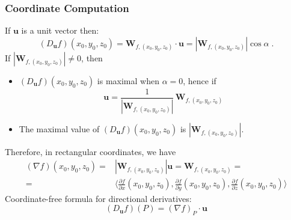 \begin{frame}
  \frametitle{Coordinate Computation}

  If $\textbf{u}$ is a unit vector then:
%
$$
  (D_{\textbf{u}}f)(x_0,y_0,z_0) =  \textbf{W}_{f,(x_0,y_0,z_0)} \cdot \textbf{u} = |\textbf{W}_{f,(x_0,y_0,z_0)}| \cos\alpha \; .
$$
%
\pause If $|\textbf{W}_{f,(x_0,y_0,z_0)}|\neq 0$, then
%
\begin{itemize}
  \item $(D_{\textbf{u}}f)(x_0,y_0,z_0)$ is maximal when $\alpha = 0$, hence if
      $$\textbf{u} = \frac{1}{|\textbf{W}_{f,(x_0,y_0,z_0)}|}\,\textbf{W}_{f,(x_0,y_0,z_0)}$$
%
  \item The maximal value of $(D_{\textbf{u}}f)(x_0,y_0,z_0)$ is $|\textbf{W}_{f,(x_0,y_0,z_0)}|$.
\end{itemize}

\pause Therefore, in rectangular coordinates, we have
%
\begin{align*}
  (\nabla f)(x_0,y_0,z_0) = & |\textbf{W}_{f,(x_0,y_0,z_0)}| \textbf{u} = \textbf{W}_{f,(x_0,y_0,z_0)} = \\
  = & \langle \frac{\partial f}{\partial x}(x_0,y_0,z_0) , \frac{\partial f}{\partial y}(x_0,y_0,z_0), \frac{\partial f}{\partial z}(x_0,y_0,z_0) \rangle
\end{align*}
%
\pause Coordinate-free formula for directional derivatives:
%
$$(D_{\textbf{u}} f)(P) = (\nabla f)_P \cdot \textbf{u}$$
\end{frame}